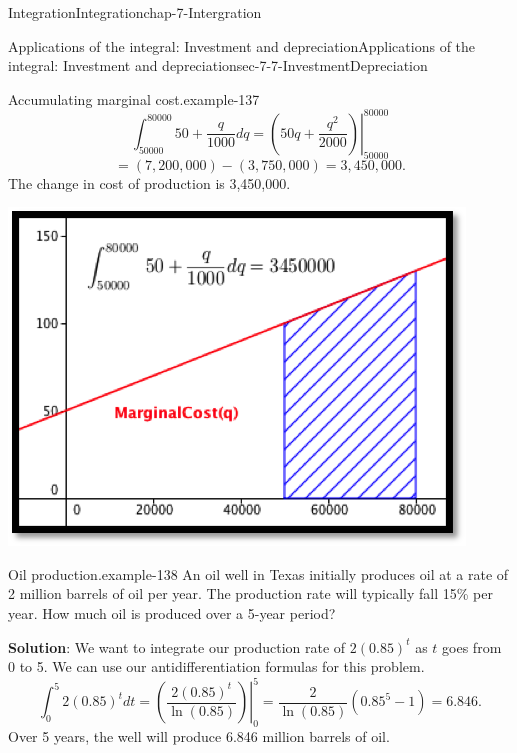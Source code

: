 \documentclass[oneside,10pt,]{book}
\newcommand{\terminology}[1]{\textbf{#1}}
\numberwithin{equation}{section}
\begin{document}
\begin{chapterptx}{Integration}{}{Integration}{}{}{chap-7-Intergration}
\begin{sectionptx}{Applications of the integral: Investment and depreciation}{}{Applications of the integral: Investment and depreciation}{}{}{sec-7-7-InvestmentDepreciation}
\begin{example}{Accumulating marginal cost.}{example-137}
%
\begin{equation*}
\int_{50000}^{80000} 50+\frac{q}{1000} dq=
\left.\left( 
50q+\frac{q^2}{2000}
\right)\right|_{50000}^{80000}
\end{equation*}
%
\begin{equation*}
=(7,200,000)-(3,750,000)=3,450,000.
\end{equation*}
\hypertarget{p-3012}{}%
The change in cost of production is \textdollar{}3,450,000.%
\begin{sidebyside}{1}{0.25}{0.25}{0}%
\begin{sbspanel}{0.5}%
\includegraphics[width=1\linewidth]{images/sec7-7-2.png}
\end{sbspanel}%
\end{sidebyside}%
\end{example}
\begin{example}{Oil production.}{example-138}%
\hypertarget{p-3013}{}%
An oil well in Texas initially produces oil at a rate of 2 million barrels of oil per year.  The production rate will typically fall 15\% per year.  How much oil is produced over a 5-year period?%
\par
\hypertarget{p-3014}{}%
\terminology{Solution}: We want to integrate our production rate of \(2(0.85)^t\) as \(t\) goes from 0 to 5.  We can use our antidifferentiation formulas for this problem.%
%
\begin{equation*}
\int_0^5 2(0.85)^t   dt= \left.\left(\frac{2(0.85)^t}{\ln (0.85)}\right)\right|_0^5=\frac{2}{\ln (0.85)}  (0.85^5-1)=6.846.
\end{equation*}
\hypertarget{p-3015}{}%
Over 5 years, the well will produce 6.846 million barrels of oil.%

\end{example}
\end{sectionptx}
\end{chapterptx}
\end{document}
